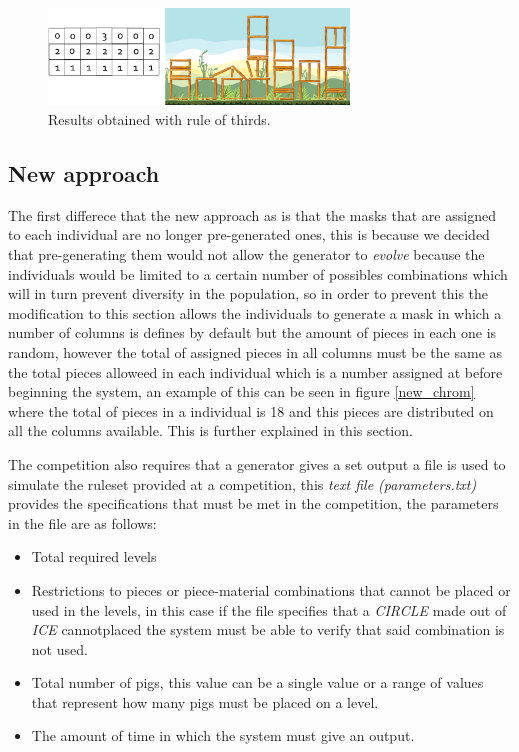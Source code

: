 \documentclass[conference]{IEEEtran}
\begin{document}
\begin{figure}[htbp]
    \centerline{\includegraphics[width=80mm]{Images/result_example_thirds.png}}
    \caption{Results obtained with rule of thirds.}
    \label{rule_of_thirds_result}
\end{figure}

\subsection{New approach}

The first differece that the new approach as is that the masks that are assigned
to each individual are no longer pre-generated ones, this is because we decided
that pre-generating them would not allow the generator to \textit{evolve}
because the individuals would be limited to a certain number of possibles
combinations which will in turn prevent diversity in the population, so in order
to prevent this the modification to this section allows the individuals to
generate a mask in which a number of columns is defines by default but the
amount of pieces in each one is random, however the total of assigned pieces in
all columns must be the same as the total pieces alloweed in each individual
which is a number assigned at before beginning the system, an example of this
can be seen in figure \ref{new_chrom} where the total of pieces in a individual
is 18 and this pieces are distributed on all the columns available. This is
further explained in this section.

The competition also requires that a generator gives a set output a file is used
to simulate the ruleset provided at a competition, this \textit{text file
(parameters.txt)} provides the specifications that must be met in the
competition, the parameters in the file are as follows:

\begin{itemize}
    \item Total required levels
    \item Restrictions to pieces or piece-material combinations that cannot be
    placed or used in the levels, in this case if the file specifies that a
    \textit{CIRCLE} made out of \textit{ICE} cannotplaced the system must be
    able to verify that said combination is not used.
    \item Total number of pigs, this value can be a single value or a range of
    values that represent how many pigs must be placed on a level.
    \item The amount of time in which the system must give an output.
\end{itemize}
\end{document}
